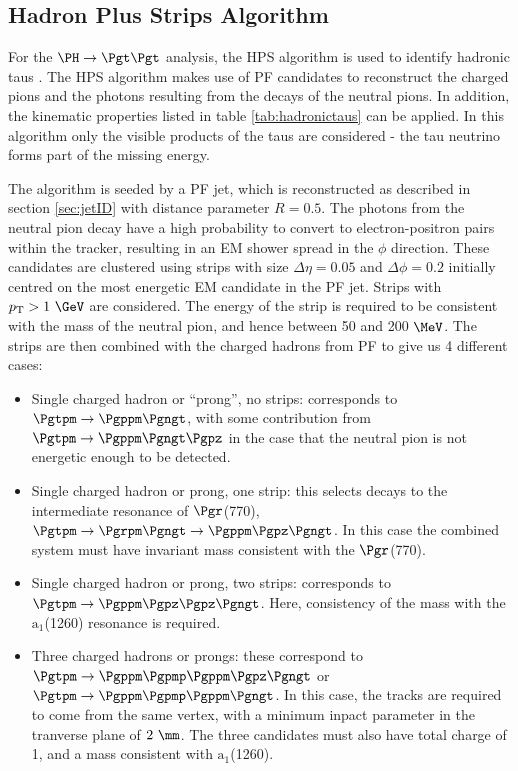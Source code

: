 \subsection{Hadron Plus Strips Algorithm}
\label{sec:hps}

For the $\PH \to \Pgt\Pgt$ analysis, the \ac{HPS} algorithm is used to identify
hadronic taus \cite{CMS-PAS-TAU-11-001}. The \ac{HPS} algorithm makes use of \ac{PF} candidates to reconstruct the
charged pions and the photons resulting from the decays of the neutral pions. In
addition, the kinematic properties listed in table \ref{tab:hadronictaus} can be
applied. In this algorithm only the visible products of the taus are considered
- the tau neutrino forms part of the missing energy.

The algorithm is seeded by a \ac{PF} jet, which is reconstructed as described in
section \ref{sec:jetID} with distance parameter $R=0.5$. The photons from the neutral pion decay have a high
probability to convert to electron-positron pairs within the tracker, resulting
in an EM shower spread in the $\phi$ direction. These candidates are clustered
using strips with size $\Delta\eta = 0.05$ and $\Delta\phi = 0.2$ initially
centred on the most energetic EM candidate in the \ac{PF} jet. Strips with
$\pt>1~\GeV$ are considered. The energy of the
strip is required to be consistent with the mass of the neutral pion, and hence
between 50 and 200 $\MeV$. The strips are then combined with the charged hadrons
from \ac{PF} to give us 4 different cases:

\begin{itemize}
\item Single charged hadron or ``prong'', no strips: corresponds to $\Pgtpm\to\Pgppm\Pgngt$,
with some contribution from $\Pgtpm\to\Pgppm\Pgngt\Pgpz$ in the case that the
neutral pion is not energetic enough to be detected.
\item Single charged hadron or prong, one strip: this selects decays to the intermediate
resonance of $\Pgr$(770), $\Pgtpm\to\Pgrpm\Pgngt\to\Pgppm\Pgpz\Pgngt$. In this
case the combined system must have invariant mass consistent with the
$\Pgr$(770).
\item Single charged hadron or prong, two strips: corresponds to
$\Pgtpm\to\Pgppm\Pgpz\Pgpz\Pgngt$. Here, consistency of the mass with the
$\text{a}_{1}$(1260) resonance is required. 
\item Three charged hadrons or prongs: these correspond to
$\Pgtpm\to\Pgppm\Pgpmp\Pgppm\Pgpz\Pgngt$ or $\Pgtpm\to\Pgppm\Pgpmp\Pgppm\Pgngt$. 
In this case, the tracks are required
to come from the same vertex, with a minimum inpact parameter in the tranverse
plane of $2~\mm$. The three candidates must also have total charge of 1, and a
mass consistent with $\text{a}_{1}$(1260). 
\end{itemize}

